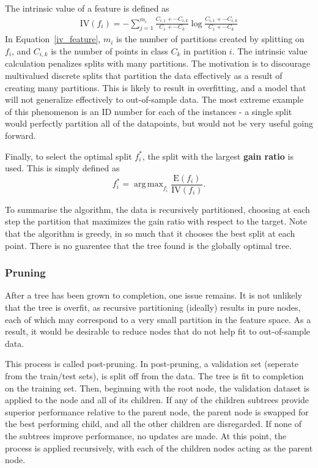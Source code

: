 \documentclass{amsart}
\DeclareMathOperator*{\argmax}{arg\,max}
\begin{document}
    The intrinsic value of a feature is defined as
    \begin{align}
        \textrm{IV}(f_i) = -\sum_{j=1}^{m_i} \frac{C_{i, 1} + \cdots C_{i, k}}
        {C_{1} + \cdots C_{k}} \log  \frac{C_{i, 1} + \cdots C_{i, k}}
        {C_{1} + \cdots C_{k}}
    \label{iv_feature}
    \end{align}
    In Equation~\ref{iv_feature}, $m_i$ is the number of partitions created by splitting
    on $f_i$, and $C_{i, k}$ is the number of points in class $C_k$ in partition $i$.
    The intrinsic value calculation penalizes splits with many partitions. The
    motivation is to discourage multivalued discrete splits that
    partition the data effectively as a result of creating many partitions. This is
    likely to result in overfitting, and a model that will not generalize effectively
    to out-of-sample data. The most extreme example of this phenomenon is an ID number
    for each of the instances - a single split would perfectly partition all of the
    datapoints, but would not be very useful going forward.

    Finally, to select the optimal split $f_i^*$, the split with the largest \textbf{gain ratio}
    is used. This is simply defined as
    \[
        f_i^* = \argmax_{f_i} \frac{\textrm{E}(f_i)}{\textrm{IV}(f_i)}.
    \]

    To summarise the algorithm, the data is recursively partitioned, choosing at each step
    the partition that maximizes the gain ratio with respect to the target. Note that
    the algorithm is greedy, in so much that it chooses the best split at each point.
    There is no guarentee that the tree found is the globally optimal tree.

    \subsubsection{Pruning}
    After a tree has been grown to completion, one issue remains. It is not unlikely that the tree is overfit,
    as recursive partitioning (ideally) results in pure nodes, each of which may correspond to a
    very small partition in the feature space. As a result, it would be desirable to reduce nodes that
    do not help fit to out-of-sample data.

    This process is called post-pruning. In post-pruning, a validation set (seperate from the train/test sets),
    is split off from the data. The tree is fit to completion on the training set. Then, beginning with the root node,
    the validation dataset is applied to the node and all of its children. If any of the children subtrees provide superior
    performance relative to the parent node, the parent node is swapped for the best performing child, and all the other children
    are disregarded. If none of the subtrees improve performance, no updates are made.
    At this point, the process is applied recursively, with each of the children nodes acting as the parent node.
\end{document}
